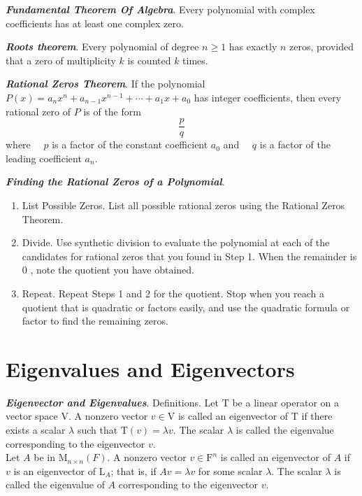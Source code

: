 \documentclass{report}
\begin{document}
    \begin{thBox}
        \textit{\textbf{Fundamental Theorem Of Algebra}}. Every polynomial with complex coefficients has at least one complex zero.
    \end{thBox}

    \begin{thBox}
        \textit{\textbf{Roots theorem}}. Every polynomial of degree $n \geq 1$ has exactly $n$ zeros, provided that a zero of multiplicity $k$ is counted $k$ times.
    \end{thBox}

    \begin{thBox}
        \textit{\textbf{Rational Zeros Theorem}}. If the polynomial $P(x)=a_n x^n+a_{n-1} x^{n-1}+\cdots+a_1 x+a_0$ has integer coefficients, then every rational zero of $P$ is of the form
        $$
        \frac{p}{q}
        $$
        where $\quad p$ is a factor of the constant coefficient $a_0$
        and $\quad q$ is a factor of the leading coefficient $a_n$.
    \end{thBox}

    \begin{noteBox}
        \textit{\textbf{Finding the Rational Zeros of a Polynomial}}.
        \begin{enumerate}
            \item List Possible Zeros. List all possible rational zeros using the Rational Zeros Theorem.
            \item Divide. Use synthetic division to evaluate the polynomial at each of the candidates for rational zeros that you found in Step 1. When the remainder is 0 , note the quotient you have obtained.
            \item Repeat. Repeat Steps 1 and 2 for the quotient. Stop when you reach a quotient that is quadratic or factors easily, and use the quadratic formula or factor to find the remaining zeros.
        \end{enumerate}
    \end{noteBox}

    \chapter{Eigenvalues and Eigenvectors}

    \begin{defBox}
        \textit{\textbf{Eigenvector and Eigenvalues}}. Definitions. Let $\mathrm{T}$ be a linear operator on a vector space V. A nonzero vector $v \in \mathrm{V}$ is called an eigenvector of $\mathrm{T}$ if there exists a scalar $\lambda$ such that $\mathrm{T}(v)=\lambda v$. The scalar $\lambda$ is called the eigenvalue corresponding to the eigenvector $v$.\\

        Let $A$ be in $\mathrm{M}_{n \times n}(F)$. A nonzero vector $v \in \mathrm{F}^n$ is called an eigenvector of $A$ if $v$ is an eigenvector of $\mathrm{L}_A$; that is, if $A v=\lambda v$ for some scalar $\lambda$. The scalar $\lambda$ is called the eigenvalue of $A$ corresponding to the eigenvector $v$.
    \end{defBox}
\end{document}
